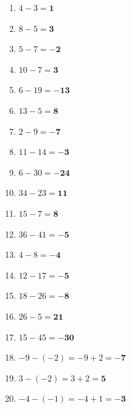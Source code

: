 \documentclass[a4paper,10pt]{article} %
\begin{document}
\begin{enumerate} %

  \item \(4 - 3 =
    \mathbf{1}\) %

  \item \(8 - 5 =
    \mathbf{3}\) %

  \item \(5 - 7 =
    \mathbf{-2}\) %

  \item \(10 - 7 =
    \mathbf{3}\) %

  \item \(6 - 19 =
    \mathbf{-13}\) %

  \item \(13 - 5 =
    \mathbf{8}\) %

  \item \(2 - 9 =
    \mathbf{-7}\) %

  \item \(11 - 14 =
    \mathbf{-3}\) %

  \item \(6 - 30 =
    \mathbf{-24}\) %

  \item \(34 - 23 =
    \mathbf{11}\) %

  \item \(15 - 7 =
    \mathbf{8}\) %

  \item \(36 - 41 =
    \mathbf{-5}\) %

  \item \(4 - 8 =
    \mathbf{-4}\) %

  \item \(12 - 17 =
    \mathbf{-5}\) %

  \item \(18 - 26 =
    \mathbf{-8}\) %

  \item \(26 - 5 =
    \mathbf{21}\) %

  \item \(15 - 45 =
    \mathbf{-30}\) %

  \item \(-9 - (-2) =
    -9 + 2 =
    \mathbf{-7}\) %

  \item \(3 - (-2) =
    3 + 2 =
    \mathbf{5}\) %

  \item \(-4 - (-1) =
    -4 + 1 =
    \mathbf{-3}\) %


\end{enumerate}
\end{document}
